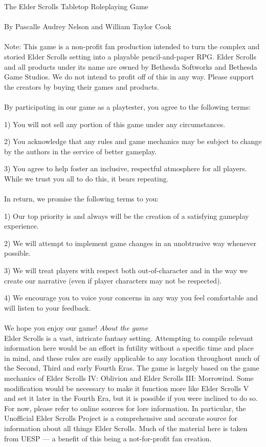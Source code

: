 \documentclass[12pt]{article}
\begin{document}
\noindent
The Elder Scrolls Tabletop Roleplaying Game\\~\\
By Pascalle Audrey Nelson and William Taylor Cook\\~\\
Note: This game is a non-profit fan production intended to turn the complex and storied Elder Scrolls setting into a playable pencil-and-paper RPG. Elder Scrolls and all products under its name are owned by Bethesda Softworks and Bethesda Game Studios. We do not intend to profit off of this in any way. Please support the creators by buying their games and products.\\~\\
By participating in our game as a playtester, you agree to the following terms:

1)	You will not sell any portion of this game under any circumstances.

2)	You acknowledge that any rules and game mechanics may be subject to change by the authors in the service of better gameplay.

3)	You agree to help foster an inclusive, respectful atmosphere for all players. While we trust you all to do this, it bears repeating.\\~\\
In return, we promise the following terms to you:

1)	Our top priority is and always will be the creation of a satisfying gameplay experience.

2)	We will attempt to implement game changes in an unobtrusive way whenever possible.

3)	We will treat players with respect both out-of-character and in the way we create our narrative (even if player characters may not be respected).

4)	We encourage you to voice your concerns in any way you feel comfortable and will listen to your feedback.\\~\\
We hope you enjoy our game!
\newpage
\noindent
\textit{About the game}\\

Elder Scrolls is a vast, intricate fantasy setting. Attempting to compile relevant information here would be an effort in futility without a specific time and place in mind, and these rules are easily applicable to any location throughout much of the Second, Third and early Fourth Eras. The game is largely based on the game mechanics of Elder Scrolls IV: Oblivion and Elder Scrolls III: Morrowind. Some modification would be necessary to make it function more like Elder Scrolls V and set it later in the Fourth Era, but it is possible if you were inclined to do so. For now, please refer to online sources for lore information. In particular, the Unofficial Elder Scrolls Project is a comprehensive and accurate source for information about all things Elder Scrolls. Much of the material here is taken from UESP --- a benefit of this being a not-for-profit fan creation.
\end{document}

